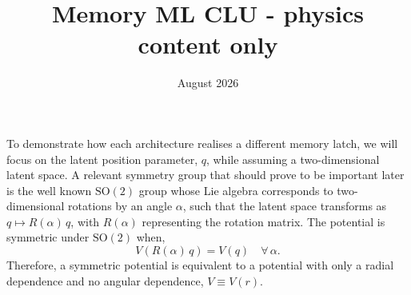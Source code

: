 \documentclass{article}
\title{Memory ML CLU - physics content only}
\date{August 2026}
\begin{document}
\maketitle



To demonstrate how each architecture realises a different memory latch, we will focus on the latent position parameter, $q$, while assuming a two-dimensional latent space. A relevant symmetry group that should prove to be important later is the well known $\mathrm{SO(2)}$ group whose Lie algebra corresponds to two-dimensional rotations by an angle $\alpha$, such that the latent space transforms as $q \mapsto R(\alpha)\, q$, with $R(\alpha)$ representing the rotation matrix. The potential is symmetric under $\mathrm{SO(2)}$ when,
\begin{equation}
V(R(\alpha)\,q)= V(q)\quad \forall\, \alpha.
\label{symmetry_definig_eq}
\end{equation}
Therefore, a symmetric potential is equivalent to a potential with only a radial dependence and no angular dependence, $V \equiv V(r)$.
\end{document}
